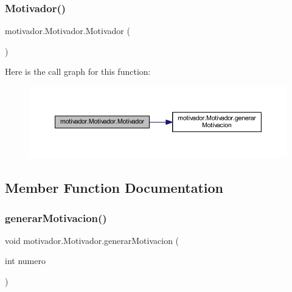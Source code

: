 \subsubsection{\texorpdfstring{Motivador()}{Motivador()}}
{\footnotesize\ttfamily motivador.\+Motivador.\+Motivador (\begin{DoxyParamCaption}{ }\end{DoxyParamCaption})}

Here is the call graph for this function\+:
\nopagebreak
\begin{figure}[H]
\begin{center}
\leavevmode
\includegraphics[width=350pt]{classmotivador_1_1_motivador_abc784d207de9f156051f0f561ef9eaee_cgraph}
\end{center}
\end{figure}


\subsection{Member Function Documentation}
\mbox{\label{classmotivador_1_1_motivador_a60414f3933faaf5fd97ed5c0a2b6d160}} 
\subsubsection{\texorpdfstring{generar\+Motivacion()}{generarMotivacion()}}
{\footnotesize\ttfamily void motivador.\+Motivador.\+generar\+Motivacion (\begin{DoxyParamCaption}\item[{int}]{numero }\end{DoxyParamCaption})}

